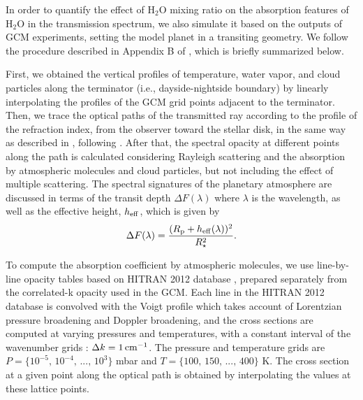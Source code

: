 \documentclass[11pt,numberedappendix,twocolappendix,]{emulateapj}
\def\water{H$_2$O }
\begin{document}
In order to quantify the effect of \water mixing ratio on the absorption features of \water in the transmission spectrum, 
we also simulate it based on the outputs of GCM experiments, setting the model planet in a transiting geometry. 
We follow the procedure described in Appendix B of \citet{Way2017}, which is briefly summarized below. 

First, we obtained the vertical profiles of temperature, water vapor, and cloud particles along the terminator (i.e., dayside-nightside boundary) by linearly interpolating the profiles of the GCM grid points adjacent to the terminator. 
Then, we trace the optical paths of the transmitted ray according to the profile of the refraction index, from the observer toward the stellar disk, in the same way as described in \citet{vanderWerf2008}, following \citet{Misra2014}. 
After that, the spectral opacity at different points along the path is calculated considering Rayleigh scattering and the absorption by atmospheric molecules and cloud particles, but not including the effect of multiple scattering. 
The spectral signatures of the planetary atmosphere are discussed in terms of the transit depth $\Delta F(\lambda )$ where $\lambda $ is the wavelength, as well as the effective height, $h_{\rm eff}$, which is given by
\begin{equation}
\Delta F(\lambda) = \frac{( R_{\rm p} + h_{\rm eff}(\lambda)  )^2}{R_{\star }^2}. 
\end{equation}

To compute the absorption coefficient by atmospheric molecules, we use line-by-line opacity tables based on HITRAN 2012 database \citep{Rothman2013}, prepared separately from the correlated-k opacity used in the GCM. 
Each line in the HITRAN 2012 database is convolved with the Voigt profile which takes account of Lorentzian pressure broadening and Doppler broadening, 
and the cross sections are computed at varying pressures and temperatures, with a constant interval of the wavenumber grids : $\Delta k = 1\,{\rm cm}^{-1}$. 
The pressure and temperature grids are $P = \{10^{-5},\, 10^{-4},\,...,\,10^3\}$ mbar and $T = \{100,\, 150,\,...,\, 400\}$ K. 
The cross section at a given point along the optical path is obtained by interpolating the values at these lattice points. 
\end{document}
